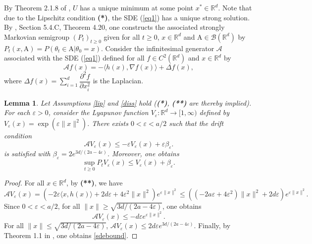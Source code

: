 \documentclass[a4paper]{article}
\newtheorem{lemma}[theorem]{Lemma}
\def\Rd{\mathbb{R}^d}
\begin{document}
By Theorem 2.1.8 of \cite{nesterov}, $U$ has a unique minimum at
some point $x^*\in\mathbb{R}^d$.
Note that due to the Lipschitz condition {\bf (*)}, the SDE (\ref{eq1}) has a unique strong solution. By \cite{kar1991}, Section 5.4.C, Theorem 4.20, one constructs the associated strongly Markovian semigroup $(P_t)_{t\geq0}$ given for all $t\geq 0$, $x \in \mathbb{R}^d$ and $\mathrm{A}\in \mathcal{B}(\mathbb{R}^d)$ by $P_t(x,\mathrm{A})=P(\theta_t \in\mathrm{A}|\theta_0=x)$. Consider the infinitesimal generator $\mathcal{A}$ associated with the SDE (\ref{eq1}) defined for all $f \in C^2(\mathbb{R}^d)$ and $x\in \mathbb{R}^d$ by
\[
\mathcal{A}f(x)=-\langle h(x),\nabla f(x) \rangle +\Delta f(x),
\]
where $\Delta f(x)=\sum\limits_{i=1}^d \dfrac{\partial^2 f}{\partial x_i^2}$ is the Laplacian.
\begin{lemma}\label{prop1}
	Let Assumptions \ref{lip} and \ref{diss} hold ({\bf (*)}, {\bf (**)} are thereby implied). For each $\varepsilon>0$, consider the Lyapunov function $V_{\varepsilon} : \Rd \rightarrow [1,\infty)$ defined by $V_{\varepsilon} (x)=\exp(\varepsilon \|x\|^2)$. There exists $0<\varepsilon < a/2$ such that the drift condition
	\begin{equation}\label{Lyapeq}
	\mathcal{A} V_{\varepsilon}(x) \leq -\varepsilon V_{\varepsilon}(x) + \varepsilon \beta_{\varepsilon}.
	\end{equation} is satisfied with $\beta_{\varepsilon}=2 e^{3d/(2a-4\varepsilon)}$. Moreover, one obtains
	\begin{equation}\label{sdebound}
	\sup_{t \geq 0} P_t V_{\varepsilon}(x) \leq V_{\varepsilon}(x) +\beta_{\varepsilon}.
	\end{equation}
\end{lemma}
\begin{proof}
	For all $x \in \mathbb{R}^d$, by {\bf{(**)}}, we have
	\[
	\mathcal{A}V_{\varepsilon}(x) = (-2\varepsilon \langle x,h(x) \rangle+2d\varepsilon+4\varepsilon^2\|x\|^2)e^{\varepsilon\|x\|^2} \leq ((-2a\varepsilon+4\varepsilon^2)\|x\|^2+2d\varepsilon)e^{\varepsilon\|x\|^2}.
	\]
	Since $0<\varepsilon < a/2$, for all $\|x\| \geq \sqrt{3d/(2a-4\varepsilon)}$,
one obtains
	\[
	\mathcal{A}V_{\varepsilon}(x)  \leq
-d\varepsilon e^{\varepsilon\|x\|^2}.
	\]
	For all $\|x\| \leq \sqrt{3d/(2a-4\varepsilon)}$, $\mathcal{A}V_{\varepsilon}(x) \leq 2d\varepsilon e^{3d/(2a-4\varepsilon)}$. Finally, by Theorem 1.1 in \cite{Mey1993}, one obtains \eqref{sdebound}.
\end{proof}
\end{document}

